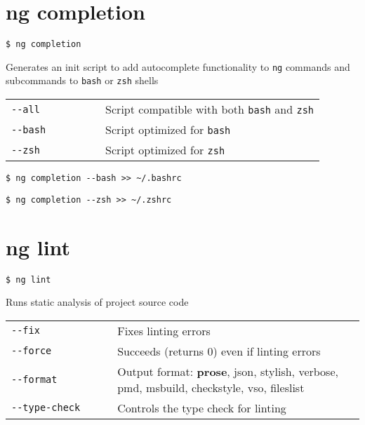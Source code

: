 \documentclass[8pt]{extarticle} %
\begin{document}
\begin{multicols}{3}
\section*{ng completion}

  \vspace{1ex}
  {\tt \$ ng completion \itt{[options...]}}

  \vspace{0.6ex}

  {\small Generates an init script to add autocomplete functionality to {\tt ng} commands and subcommands 
  to {\tt bash} or {\tt zsh} shells}

  \vspace{0.6ex}

  \begin{tabular}{L{0.30\linewidth} L{0.70\linewidth}}
    \tt -{}-all  & \small Script compatible with both {\tt bash} and {\tt zsh} \\
    \tt -{}-bash & \small Script optimized for {\tt bash} \\
    \tt -{}-zsh  & \small Script optimized for {\tt zsh}
  \end{tabular}

  \vspace{0.6ex}

  {\tt \$ ng completion -{}-bash >{}> \textasciitilde/.bashrc}

  {\tt \$ ng completion -{}-zsh >{}> \textasciitilde/.zshrc}

\section*{ng lint}

  \vspace{1ex}
  {\tt \$ ng lint \itt{[options...]}}

  \vspace{0.6ex}

  {\small Runs static analysis of project source code}

  \begin{tabular}{L{0.30\linewidth} L{0.70\linewidth}}
    \tt -{}-fix  & \small Fixes linting errors \\
    \tt -{}-force  & \small Succeeds (returns 0) even if linting errors \\
    \tt -{}-format & \small Output format: {\bf prose}, json, stylish, verbose, pmd, msbuild, checkstyle, vso, fileslist \\
    \tt -{}-type-check & \small Controls the type check for linting
  \end{tabular}


\end{multicols}
\end{document}
